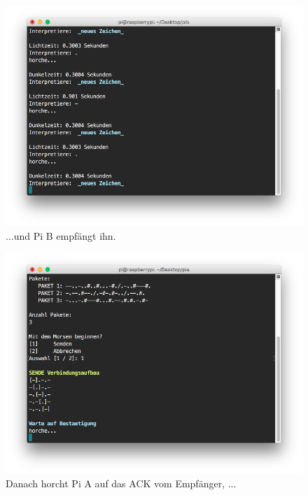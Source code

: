 \documentclass[12pt, a4paper]{article}
\begin{document}
\newpage
\begin{figure}[H]
	\centering
	\includegraphics[width=1.0\textwidth]{sshot_11.png}
	\caption{...und Pi B empfängt ihn.}
\end{figure}

\newpage
\begin{figure}[H]
	\centering
	\includegraphics[width=1.0\textwidth]{sshot_12.png}
	\caption{Danach horcht Pi A auf das ACK vom Empfänger, ...}
\end{figure}
\end{document}
